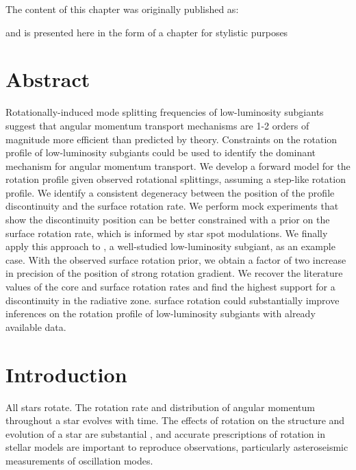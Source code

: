 The content of this chapter was originally published as:
\begin{quote}
	\citet{tanner_ast}
\end{quote}
and is presented here in the form of a chapter for stylistic purposes 

\newpage

\section*{Abstract}

Rotationally-induced mode splitting frequencies of low-luminosity subgiants suggest that angular momentum transport mechanisms are 1-2 orders of magnitude more efficient  than predicted by theory. Constraints on the rotation profile of low-luminosity subgiants could be used to identify the dominant mechanism for angular momentum transport. We develop a forward model for the rotation profile given observed rotational splittings, assuming a step-like rotation profile. We identify a consistent degeneracy between the position of the profile discontinuity and the surface rotation rate. We perform mock experiments that show the discontinuity position can be better constrained with a prior on the surface rotation rate, which is informed by star spot modulations. We finally apply this approach to \thestar, a well-studied low-luminosity subgiant, as an example case. With the observed surface rotation prior, we obtain a factor of two increase in precision of the position of strong rotation gradient. We recover the literature values of the core and surface rotation rates and find the highest support for a discontinuity in the radiative zone. surface rotation could substantially improve inferences on the rotation profile of low-luminosity subgiants with already available data.


\section{Introduction}
\label{sec:intro}

All stars rotate. The rotation rate and distribution of angular momentum throughout a star evolves with time. The effects of rotation on the structure and evolution of a star are substantial \citep[e.g.][]{heger_presupernova_1998,maeder_evolution_2000}, and accurate prescriptions of rotation in stellar models are important to reproduce observations, particularly asteroseismic measurements of oscillation modes.

